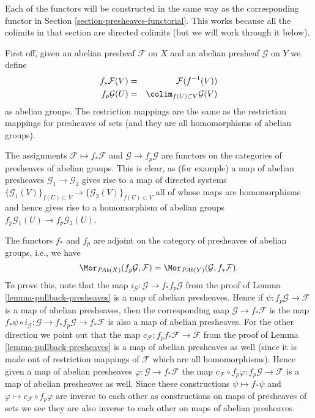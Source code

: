 \medskip\noindent
Each of the functors will be constructed in the same
way as the corresponding functor in
Section \ref{section-presheaves-functorial}.
This works because all the colimits in that section
are directed colimits (but we will work through it below).

\medskip\noindent
First off, given an abelian presheaf $\mathcal{F}$ on $X$ and
an abelian presheaf $\mathcal{G}$ on $Y$ we define
\begin{eqnarray*}
f_*\mathcal{F}(V) & = & \mathcal{F}(f^{-1}(V)) \\
f_p\mathcal{G}(U) & = & \colim_{f(U) \subset V} \mathcal{G}(V)
\end{eqnarray*}
as abelian groups. The restriction mappings are the same as
the restriction mappings for presheaves of sets (and they are
all homomorphisms of abelian groups).

\medskip\noindent
The assignments $\mathcal{F} \mapsto f_*\mathcal{F}$ and
$\mathcal{G} \to f_p\mathcal{G}$ are functors on
the categories of presheaves of abelian groups.
This is clear, as (for example) a map of abelian presheaves
$\mathcal{G}_1 \to \mathcal{G}_2$ gives rise to a map of
directed systems
$\{\mathcal{G}_1(V)\}_{f(U) \subset V} \to
\{\mathcal{G}_2(V)\}_{f(U) \subset V}$
all of whose maps are homomorphisms
and hence gives rise to a homomorphism of abelian groups
$f_p\mathcal{G}_1(U) \to f_p\mathcal{G}_2(U)$.

\medskip\noindent
The functors $f_*$ and $f_p$ are adjoint on the
category of presheaves of abelian groups, i.e., we have
$$
\Mor_{\textit{PAb}(X)}(f_p\mathcal{G}, \mathcal{F})
=
\Mor_{\textit{PAb}(Y)}(\mathcal{G}, f_*\mathcal{F}).
$$
To prove this, note that the map
$i_\mathcal{G} : \mathcal{G} \to f_* f_p\mathcal{G}$ from the proof
of Lemma \ref{lemma-pullback-presheaves}
is a map of abelian presheaves. Hence if
$\psi : f_p\mathcal{G} \to \mathcal{F}$
is a map of abelian presheaves, then the corresponding map
$\mathcal{G} \to f_*\mathcal{F}$ is the map
$f_*\psi \circ i_\mathcal{G} :
\mathcal{G} \to f_* f_p \mathcal{G} \to f_* \mathcal{F}$
is also a map of abelian presheaves. For the other direction
we point out that the map
$c_\mathcal{F} : f_p f_* \mathcal{F} \to \mathcal{F}$
from the proof of Lemma \ref{lemma-pullback-presheaves} is a
map of abelian presheaves as well (since it is made out of restriction
mappings of $\mathcal{F}$ which are all homomorphisms). Hence
given a map of abelian presheaves $\varphi : \mathcal{G} \to f_*\mathcal{F}$
the map
$c_\mathcal{F} \circ f_p\varphi : f_p\mathcal{G} \to \mathcal{F}$
is a map of abelian presheaves as well. Since these constructions
$\psi \mapsto f_*\psi$ and $\varphi \mapsto c_\mathcal{F} \circ f_p\varphi$
are inverse to each other as constructions on maps of presheaves of sets
we see they are also inverse to each other on maps of abelian presheaves.

